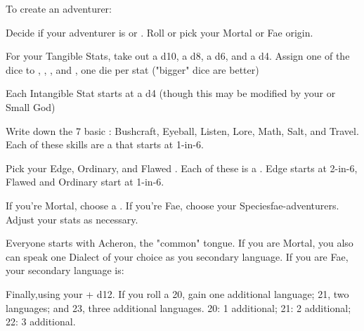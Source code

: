 {

To create an adventurer:


Decide if your adventurer is  or .  Roll or pick your Mortal or Fae origin.


For your Tangible Stats, take out a d10, a d8, a d6, and a d4.  Assign one of the dice to \VIG, \DEX, \INT, and \FOC, one die per stat ("bigger" dice are better)

Each Intangible Stat starts at a d4 (though this may be modified by your  or Small God)


Write down the 7 basic : Bushcraft, Eyeball, Listen, Lore, Math, Salt, and Travel.  Each of these skills are a \KNACK that starts at 1-in-6.


Pick your Edge, Ordinary, and Flawed .  Each of these is a \KNACK.  Edge starts at 2-in-6, Flawed and Ordinary start at 1-in-6.

\cbreak


If you're Mortal, choose a .  If you're Fae, choose your {Species}{fae-adventurers}. Adjust your stats as necessary.


Everyone starts with Acheron, the "common" tongue. If you are Mortal, you also can speak one Dialect of your choice as you secondary language.  If you are Fae, your secondary language is:

Finally,\RO using your \INT + d12.  If you roll a 20, gain one additional language; 21, two languages; and 23, three additional languages. 20: 1 additional; 21: 2 additional; 22: 3 additional.

}
